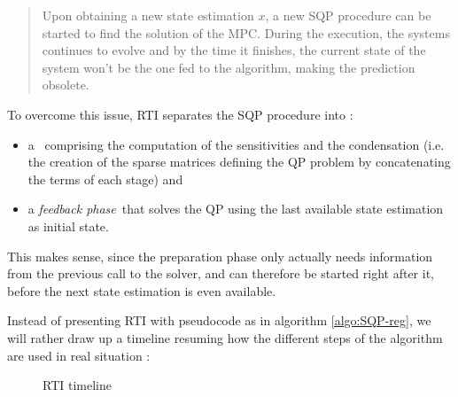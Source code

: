 \documentclass[12pt]{article}
\begin{document}
\begin{quote}
	Upon obtaining a new state estimation $x$, a new SQP procedure can be started to find the solution of the MPC.
	During the execution, the systems continues to evolve and by the time it finishes, the current state of the system won't be the one fed to the algorithm, making the prediction obsolete.
\end{quote}

To overcome this issue, RTI separates the SQP procedure into :
\begin{itemize}[label=\textbullet]
	\item a \color{black}~comprising the computation of the sensitivities and the condensation (i.e. the creation of the sparse matrices defining the QP problem by concatenating the terms of each stage) and

	\item a \color{blue}\textit{feedback phase}\color{black}~that solves the QP using the last available state estimation as initial state.
\end{itemize}

This makes sense, since the preparation phase only actually needs information from the previous call to the solver, and can therefore be started right after it, before the next state estimation is even available.

Instead of presenting RTI with pseudocode as in algorithm \ref{algo:SQP-reg}, we will rather draw up a timeline resuming how the different steps of the algorithm are used in real situation :

\vspace{12pt}

\begin{figure}[H]
	\startchronology[startyear=-3,stopyear=5,startdate=false,dates=false,color=black,width=\textwidth, arrow=true]
	\stopchronology
	\caption{RTI timeline}
	\label{fig:RTI-timeline}
\end{figure}
\end{document}
